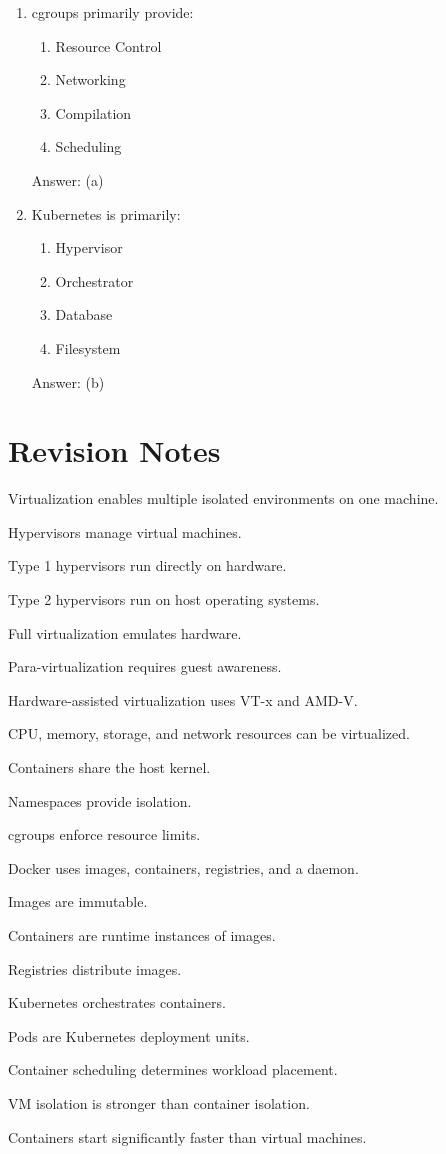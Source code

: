 \begin{enumerate}
\item cgroups primarily provide:
\begin{enumerate}[label=(\alph*)]
\item Resource Control
\item Networking
\item Compilation
\item Scheduling
\end{enumerate}
Answer: (a)

\item Kubernetes is primarily:
\begin{enumerate}[label=(\alph*)]
\item Hypervisor
\item Orchestrator
\item Database
\item Filesystem
\end{enumerate}
Answer: (b)

\end{enumerate}

\section{Revision Notes}

\begin{revisionnotes}
\item Virtualization enables multiple isolated environments on one machine.
\item Hypervisors manage virtual machines.
\item Type 1 hypervisors run directly on hardware.
\item Type 2 hypervisors run on host operating systems.
\item Full virtualization emulates hardware.
\item Para-virtualization requires guest awareness.
\item Hardware-assisted virtualization uses VT-x and AMD-V.
\item CPU, memory, storage, and network resources can be virtualized.
\item Containers share the host kernel.
\item Namespaces provide isolation.
\item cgroups enforce resource limits.
\item Docker uses images, containers, registries, and a daemon.
\item Images are immutable.
\item Containers are runtime instances of images.
\item Registries distribute images.
\item Kubernetes orchestrates containers.
\item Pods are Kubernetes deployment units.
\item Container scheduling determines workload placement.
\item VM isolation is stronger than container isolation.
\item Containers start significantly faster than virtual machines.
\end{revisionnotes}

